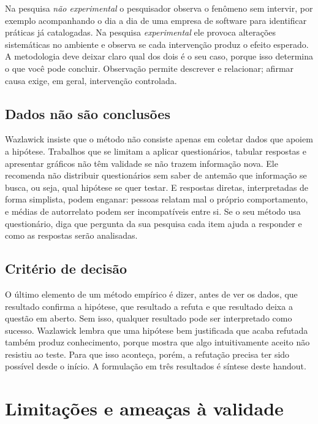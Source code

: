 \documentclass[10pt,a4paper]{extarticle}
\theoremstyle{definition}
\begin{document}
Na pesquisa \emph{não experimental} o pesquisador observa o fenômeno sem intervir, por exemplo acompanhando o dia a dia de uma empresa de software para identificar práticas já catalogadas. Na pesquisa \emph{experimental} ele provoca alterações sistemáticas no ambiente e observa se cada intervenção produz o efeito esperado. A metodologia deve deixar claro qual dos dois é o seu caso, porque isso determina o que você pode concluir. Observação permite descrever e relacionar; afirmar causa exige, em geral, intervenção controlada.

\subsection{Dados não são conclusões}

Wazlawick insiste que o método não consiste apenas em coletar dados que apoiem a hipótese. Trabalhos que se limitam a aplicar questionários, tabular respostas e apresentar gráficos não têm validade se não trazem informação nova. Ele recomenda não distribuir questionários sem saber de antemão que informação se busca, ou seja, qual hipótese se quer testar. E respostas diretas, interpretadas de forma simplista, podem enganar: pessoas relatam mal o próprio comportamento, e médias de autorrelato podem ser incompatíveis entre si. Se o seu método usa questionário, diga que pergunta da sua pesquisa cada item ajuda a responder e como as respostas serão analisadas.

\subsection{Critério de decisão}

O último elemento de um método empírico é dizer, antes de ver os dados, que resultado confirma a hipótese, que resultado a refuta e que resultado deixa a questão em aberto. Sem isso, qualquer resultado pode ser interpretado como sucesso. Wazlawick lembra que uma hipótese bem justificada que acaba refutada também produz conhecimento, porque mostra que algo intuitivamente aceito não resistiu ao teste. Para que isso aconteça, porém, a refutação precisa ter sido possível desde o início. A formulação em três resultados é síntese deste handout.

\section{Limitações e ameaças à validade}\label{sec:limites}
\end{document}

